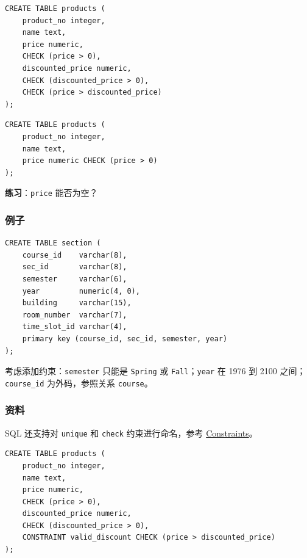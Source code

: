\documentclass[aspectratio=169, 14pt]{beamer}
\begin{document}
\begin{frame}[fragile]

    \begin{verbatim}
CREATE TABLE products (
    product_no integer,
    name text,
    price numeric,
    CHECK (price > 0),
    discounted_price numeric,
    CHECK (discounted_price > 0),
    CHECK (price > discounted_price)
);
    \end{verbatim}
\end{frame}

\begin{frame}[fragile]
    \begin{verbatim}
CREATE TABLE products (
    product_no integer,
    name text,
    price numeric CHECK (price > 0)
);
    \end{verbatim}
    {\large {}}  \textbf{练习}：\texttt{price} 能否为空？

\pause


\end{frame}

\begin{frame}[fragile]
    \frametitle{例子}

\begin{verbatim}
CREATE TABLE section (
    course_id    varchar(8),
    sec_id       varchar(8),
    semester     varchar(6),
    year         numeric(4, 0),
    building     varchar(15),
    room_number  varchar(7),
    time_slot_id varchar(4),
    primary key (course_id, sec_id, semester, year)
);
\end{verbatim}
    
考虑添加约束：\texttt{semester} 只能是 \texttt{Spring} 或 \texttt{Fall}；\texttt{year} 在 1976 到 2100 之间；\texttt{course\_id} 为外码，参照关系 \texttt{course}。
\end{frame}

\begin{frame}[fragile]
    \frametitle{资料}
SQL 还支持对 \texttt{unique} 和 \texttt{check} 约束进行命名，参考 \href{https://www.postgresql.org/docs/14/ddl-constraints.html}{Constraints}。

\begin{verbatim}
CREATE TABLE products (
    product_no integer,
    name text,
    price numeric,
    CHECK (price > 0),
    discounted_price numeric,
    CHECK (discounted_price > 0),
    CONSTRAINT valid_discount CHECK (price > discounted_price)
);
\end{verbatim}

\end{frame}
\end{document}

